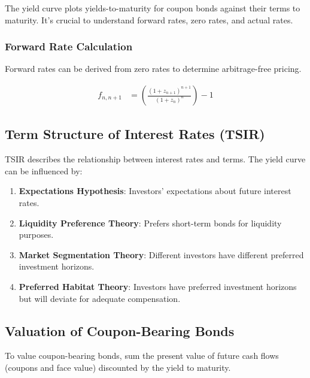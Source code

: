 \documentclass[
]{book}
\providecommand{\tightlist}{%
  \setlength{\itemsep}{0pt}\setlength{\parskip}{0pt}}
\begin{document}
The yield curve plots yields-to-maturity for coupon bonds against their terms to maturity. It's crucial to understand forward rates, zero rates, and actual rates.

\hypertarget{forward-rate-calculation}{%
\subsubsection{Forward Rate Calculation}\label{forward-rate-calculation}}

Forward rates can be derived from zero rates to determine arbitrage-free pricing.

\[
\begin{align}
f_{n,n+1} &= \left( \frac{(1 + z_{n+1})^{n+1}}{(1 + z_n)^n} \right) - 1
\end{align}
\]

\hypertarget{term-structure-of-interest-rates-tsir}{%
\subsection{Term Structure of Interest Rates (TSIR)}\label{term-structure-of-interest-rates-tsir}}

TSIR describes the relationship between interest rates and terms. The yield curve can be influenced by:

\begin{enumerate}
\def\labelenumi{\arabic{enumi}.}
\tightlist
\item
  \textbf{Expectations Hypothesis}: Investors' expectations about future interest rates.
\item
  \textbf{Liquidity Preference Theory}: Prefers short-term bonds for liquidity purposes.
\item
  \textbf{Market Segmentation Theory}: Different investors have different preferred investment horizons.
\item
  \textbf{Preferred Habitat Theory}: Investors have preferred investment horizons but will deviate for adequate compensation.
\end{enumerate}

\hypertarget{valuation-of-coupon-bearing-bonds}{%
\subsection{Valuation of Coupon-Bearing Bonds}\label{valuation-of-coupon-bearing-bonds}}

To value coupon-bearing bonds, sum the present value of future cash flows (coupons and face value) discounted by the yield to maturity.
\end{document}
